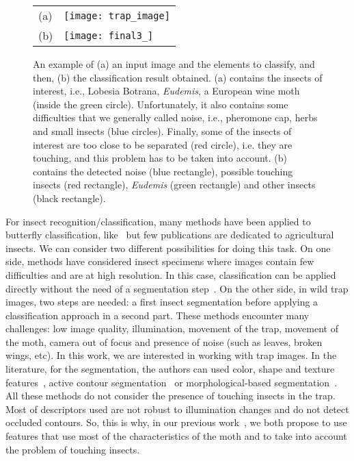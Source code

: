\documentclass[a4paper,conference]{IEEEtran}
\begin{document}
\begin{figure}[!t]
\centering
\begin{tabular}{m{}m{}}
(a)&\texttt{[image: trap\_image]}\\
(b)&\texttt{[image: final3\_]}\\
\end{tabular}
\caption{An example of (a) an input image and the elements to classify, and then, (b) the classification result obtained. (a) contains the insects of interest, i.e., Lobesia Botrana, \textit{Eudemis}, a European wine moth (inside the green circle). Unfortunately, it also contains some difficulties that we generally called noise, i.e., pheromone cap, herbs and small insects (blue circles). Finally, some of the insects of interest are too close to be separated (red circle), i.e. they are touching, and this problem has to be taken into account. (b) contains the detected noise (blue rectangle), possible touching insects (red rectangle), \textit{Eudemis} (green rectangle) and other insects (black rectangle).}
\label{Trap_image}
\end{figure} 


For insect recognition/classification, 
many methods have been applied to butterfly classification, 
like~\cite{kang2014identification,kaya2014application} but few publications are dedicated to agricultural insects. %
We can consider two different possibilities for doing this task. 
On one side, methods have considered insect specimens \cite{kang2014identification,wang2012new} where images contain few difficulties and are at high resolution. In this case, classification can be applied directly without the need of a segmentation step~\cite{DBLP:journals/corr/DingT16}. %
On the other side, in wild trap images, two steps are needed: a first insect segmentation before applying a classification approach in a second part. These methods encounter many challenges: low image quality, illumination, movement of the trap, movement of the moth, camera out of focus and presence of noise (such as leaves, broken wings, etc). %
In this work, we are interested in working with trap images. In the literature, for the segmentation, the authors can used color, shape and texture features~\cite{yalcin2015vision,qing2012insect}, active contour segmentation~\cite{yalcin2015vision} or morphological-based segmentation~\cite{wen2015pose}. 
All these methods do not consider the presence of touching insects in the trap. Most of descriptors used are not robust to illumination changes and do not detect occluded contours. So, this is why, in our previous work~\cite{bakkay2017automatic}, we both propose to use features that use most of the characteristics of the moth and to  take into account the problem of touching insects.
\end{document}
